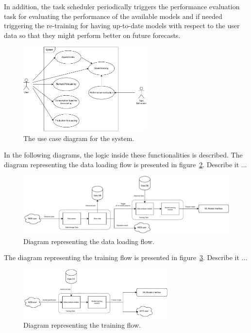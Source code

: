 In addition, the task scheduler periodically triggers the performance evaluation task for evaluating the performance of the available models and if needed triggering the re-training for having up-to-date models with respect to the user data so that they might perform better on future forecasts.

\begin{figure}[H]
\centering 
\includegraphics[width=0.6\textwidth]{images/architecture_use_case}
\caption{The use case diagram for the system.}
\label{fig:usecase}
\end{figure}

In the following diagrams, the logic inside these functionalities is described.
The diagram representing the data loading flow is presented in figure~\ref{fig:loadingflow}.
Describe it ...

\begin{figure}[H]
\centering 
\includegraphics[width=1\textwidth]{images/architecture_data_loading_flow}
\caption{Diagram representing the data loading flow.}
\label{fig:loadingflow}
\end{figure}

The diagram representing the training flow is presented in figure~\ref{fig:trainingflow}.
Describe it ...

\begin{figure}[H]
\centering 
\includegraphics[width=0.7\textwidth]{images/architecture_training_flow}
\caption{Diagram representing the training flow.}
\label{fig:trainingflow}
\end{figure}

